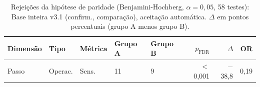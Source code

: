 \begin{table}[htbp]
\centering
\caption{Rejei\c{c}\~oes da hip\'otese de paridade (Benjamini-Hochberg, $\alpha = 0{,}05$, 58 testes): Base inteira v3.1 (confirm., comparação), aceitação automática. $\Delta$ em pontos percentuais (grupo A menos grupo B).}
\label{tab:equidade-arranjo-rejeicoes-cascata-v31-confirmacao}
\footnotesize\setlength{\tabcolsep}{3pt}
\begin{tabular}{lllllrrr}
\toprule
Dimens\~ao & Tipo & M\'etrica & Grupo A & Grupo B & $p_{\mathrm{FDR}}$ & $\Delta$ & OR \\
\midrule
Passo & Operac. & Sens. & 11 & 9 & $<$0{,}001 & $-$38{,}8 & 0{,}19 \\
\bottomrule
\end{tabular}
\par{}\end{table}
